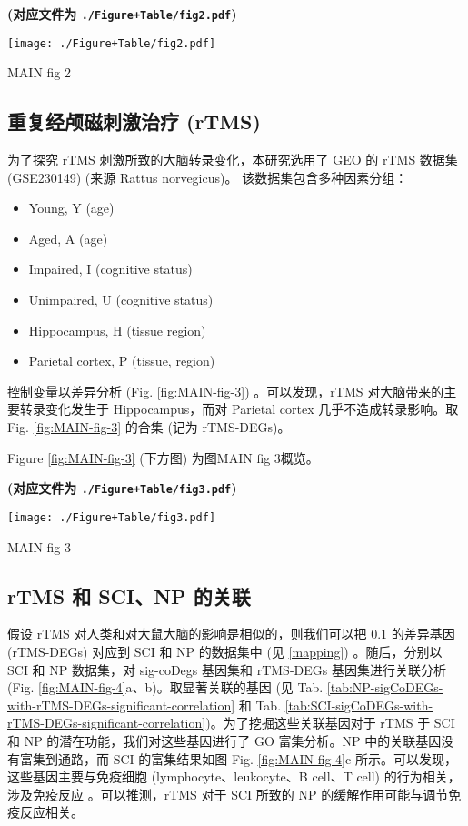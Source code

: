 \documentclass[
]{article}
\providecommand{\tightlist}{%
  \setlength{\itemsep}{0pt}\setlength{\parskip}{0pt}}
\begin{document}
\textbf{(对应文件为 \texttt{./Figure+Table/fig2.pdf})}

\def\@captype{figure}
\begin{center}
\texttt{[image: ./Figure+Table/fig2.pdf]}
\caption{MAIN fig 2}\label{fig:MAIN-fig-2}
\end{center}

\hypertarget{res-rtms}{%
\subsection{重复经颅磁刺激治疗 (rTMS)}\label{res-rtms}}

为了探究 rTMS 刺激所致的大脑转录变化，本研究选用了 GEO 的 rTMS 数据集 (GSE230149) (来源 Rattus norvegicus)。
该数据集包含多种因素分组：

\begin{itemize}
\tightlist
\item
  Young, Y (age)
\item
  Aged, A (age)
\item
  Impaired, I (cognitive status)
\item
  Unimpaired, U (cognitive status)
\item
  Hippocampus, H (tissue region)
\item
  Parietal cortex, P (tissue, region)
\end{itemize}

控制变量以差异分析 (Fig. \ref{fig:MAIN-fig-3}) 。可以发现，rTMS 对大脑带来的主要转录变化发生于 Hippocampus，而对 Parietal cortex 几乎不造成转录影响。取 Fig. \ref{fig:MAIN-fig-3} 的合集 (记为 rTMS-DEGs)。

Figure \ref{fig:MAIN-fig-3} (下方图) 为图MAIN fig 3概览。

\textbf{(对应文件为 \texttt{./Figure+Table/fig3.pdf})}

\def\@captype{figure}
\begin{center}
\texttt{[image: ./Figure+Table/fig3.pdf]}
\caption{MAIN fig 3}\label{fig:MAIN-fig-3}
\end{center}

\hypertarget{rtms-ux548c-scinp-ux7684ux5173ux8054}{%
\subsection{rTMS 和 SCI、NP 的关联}\label{rtms-ux548c-scinp-ux7684ux5173ux8054}}

假设 rTMS 对人类和对大鼠大脑的影响是相似的，则我们可以把 \ref{res-rtms} 的差异基因 (rTMS-DEGs) 对应到 SCI 和 NP 的数据集中 (见 \ref{mapping}) 。随后，分别以 SCI 和 NP 数据集，对 sig-coDegs 基因集和 rTMS-DEGs 基因集进行关联分析 (Fig. \ref{fig:MAIN-fig-4}a、b)。取显著关联的基因 (见 Tab. \ref{tab:NP-sigCoDEGs-with-rTMS-DEGs-significant-correlation} 和 Tab. \ref{tab:SCI-sigCoDEGs-with-rTMS-DEGs-significant-correlation})。为了挖掘这些关联基因对于 rTMS 于 SCI 和 NP 的潜在功能，我们对这些基因进行了 GO 富集分析。NP 中的关联基因没有富集到通路，而 SCI 的富集结果如图 Fig. \ref{fig:MAIN-fig-4}c 所示。可以发现，这些基因主要与免疫细胞 (lymphocyte、leukocyte、B cell、T cell) 的行为相关，涉及免疫反应 。可以推测，rTMS 对于 SCI 所致的 NP 的缓解作用可能与调节免疫反应相关。
\end{document}
